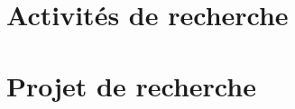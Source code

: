\documentclass[10pt,a4paper,twoside]{article}
\title{\textsc{Dossier de candidature aux fonctions de Maître de conférences \\ Institut Jean le rond d'Alembert UMR 7190} \vskip 0.5cm Non linéarités en Mécanique des Solides, Matériaux et Structures \vskip .5cm
  \begin{flushleft}
    \normalsize
    N$^{\text{o}}$ Galaxie : 289  \\
    N$^{\text{o}}$ local : 60MCF1163 \\
    {\'E}tablissement : Sorbonne Université -- Campus Pierre et Marie Curie
  \end{flushleft}
}
\author{\textsc{Adrien Renaud}\\
  N$^{\text{o}}$ de qualification : 19260330499 \\
  5 rue Clisson --  75013 Paris\\
  \textsc{Mail : }adri.renaud@gmail.com \\
  \textsc{Téléphone : } 06 79 38 81 43
}
\date{}
\begin{document}
\maketitle
\tableofcontents{}

\newpage


\tikzexternaldisable



%



%

\section{Activités de recherche} 


\section{Projet de recherche}
\label{sec:projet-de-recherche}

\begin{refsection}

  
  \printbibliography[heading=subbibliography]
\end{refsection}
\end{document}
